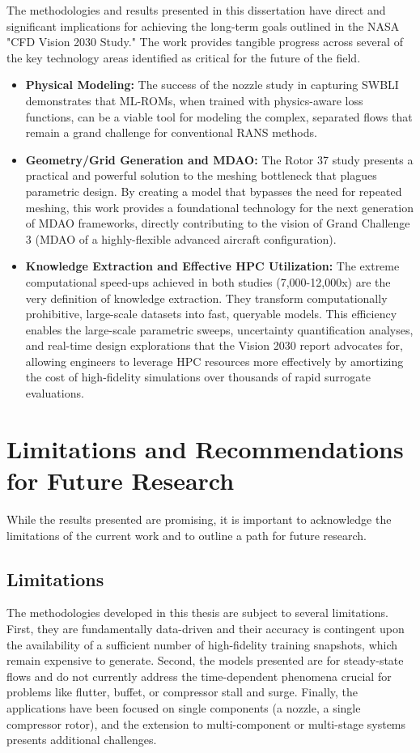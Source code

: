 \documentclass[12pt, a4paper]{report}
\begin{document}
The methodologies and results presented in this dissertation have direct and significant implications for achieving the long-term goals outlined in the NASA "CFD Vision 2030 Study." The work provides tangible progress across several of the key technology areas identified as critical for the future of the field.

\begin{itemize}
    \item \textbf{Physical Modeling:} The success of the nozzle study in capturing SWBLI demonstrates that ML-ROMs, when trained with physics-aware loss functions, can be a viable tool for modeling the complex, separated flows that remain a grand challenge for conventional RANS methods.
    \item \textbf{Geometry/Grid Generation and MDAO:} The Rotor 37 study presents a practical and powerful solution to the meshing bottleneck that plagues parametric design. By creating a model that bypasses the need for repeated meshing, this work provides a foundational technology for the next generation of MDAO frameworks, directly contributing to the vision of Grand Challenge 3 (MDAO of a highly-flexible advanced aircraft configuration).
    \item \textbf{Knowledge Extraction and Effective HPC Utilization:} The extreme computational speed-ups achieved in both studies (7,000-12,000x) are the very definition of knowledge extraction. They transform computationally prohibitive, large-scale datasets into fast, queryable models. This efficiency enables the large-scale parametric sweeps, uncertainty quantification analyses, and real-time design explorations that the Vision 2030 report advocates for, allowing engineers to leverage HPC resources more effectively by amortizing the cost of high-fidelity simulations over thousands of rapid surrogate evaluations.
\end{itemize}

\section{Limitations and Recommendations for Future Research}

While the results presented are promising, it is important to acknowledge the limitations of the current work and to outline a path for future research.

\subsection{Limitations}
The methodologies developed in this thesis are subject to several limitations. First, they are fundamentally data-driven and their accuracy is contingent upon the availability of a sufficient number of high-fidelity training snapshots, which remain expensive to generate. Second, the models presented are for steady-state flows and do not currently address the time-dependent phenomena crucial for problems like flutter, buffet, or compressor stall and surge. Finally, the applications have been focused on single components (a nozzle, a single compressor rotor), and the extension to multi-component or multi-stage systems presents additional challenges.
\end{document}
